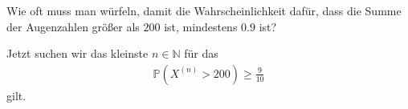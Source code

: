\begin{exercise}

Wie oft muss man würfeln, damit die Wahrscheinlichkeit dafür, dass die Summe der Augenzahlen größer als $200$ ist, mindestens $0.9$ ist?

\end{exercise}

\begin{solution}

Jetzt suchen wir das kleinste $n \in \mathbb{N}$ für das 
\begin{align*}
    \mathbb{P}(X^(n) > 200) \geq \frac{9}{10}
\end{align*}
gilt. 

\end{solution}

